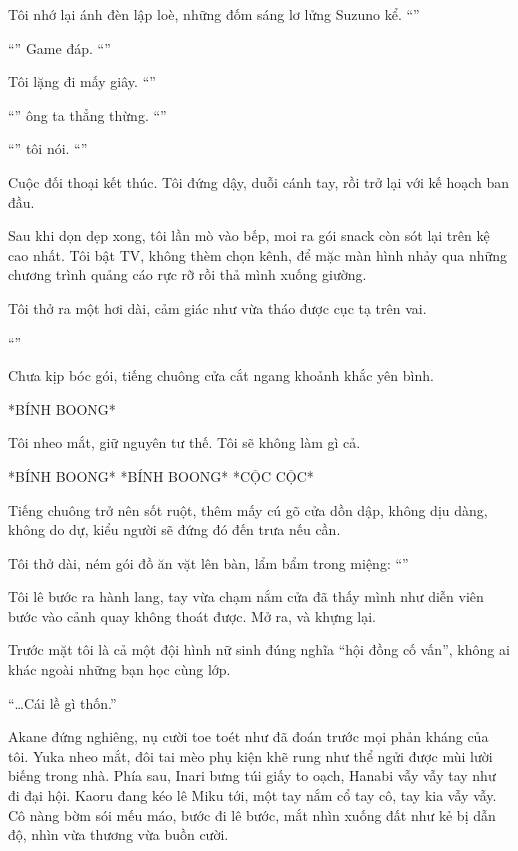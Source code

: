 \documentclass[../main.tex]{subfiles}
\begin{document}
Tôi nhớ lại ánh đèn lập loè, những đốm sáng lơ lửng Suzuno kể. ``''

``'' Game đáp. ``''

Tôi lặng đi mấy giây. ``''

``'' ông ta thẳng thừng. ``''

``'' tôi nói. ``''

Cuộc đối thoại kết thúc. Tôi đứng dậy, duỗi cánh tay, rồi trở lại với kế hoạch ban đầu.

Sau khi dọn dẹp xong, tôi lần mò vào bếp, moi ra gói snack còn sót lại trên kệ cao nhất. Tôi bật TV, không thèm chọn kênh, để mặc màn hình nhảy qua những chương trình quảng cáo rực rỡ rồi thả mình xuống giường.

Tôi thở ra một hơi dài, cảm giác như vừa tháo được cục tạ trên vai.

``''

Chưa kịp bóc gói, tiếng chuông cửa cắt ngang khoảnh khắc yên bình.

*BÍNH BOONG*

Tôi nheo mắt, giữ nguyên tư thế. Tôi sẽ không làm gì cả.

*BÍNH BOONG* *BÍNH BOONG* *CỘC CỘC*

Tiếng chuông trở nên sốt ruột, thêm mấy cú gõ cửa dồn dập, không dịu dàng, không do dự, kiểu người sẽ đứng đó đến trưa nếu cần.

Tôi thở dài, ném gói đồ ăn vặt lên bàn, lẩm bẩm trong miệng: ``''

Tôi lê bước ra hành lang, tay vừa chạm nắm cửa đã thấy mình như diễn viên bước vào cảnh quay không thoát được. Mở ra, và khựng lại.

Trước mặt tôi là cả một đội hình nữ sinh đúng nghĩa ``hội đồng cố vấn'', không ai khác ngoài những bạn học cùng lớp.

``\dots Cái lề gì thốn.''

Akane đứng nghiêng, nụ cười toe toét như đã đoán trước mọi phản kháng của tôi. Yuka nheo mắt, đôi tai mèo phụ kiện khẽ rung như thể ngửi được mùi lười biếng trong nhà. Phía sau, Inari bưng túi giấy to oạch, Hanabi vẫy vẫy tay như đi đại hội. Kaoru đang kéo lê Miku tới, một tay nắm cổ tay cô, tay kia vẫy vẫy. Cô nàng bờm sói mếu máo, bước đi lê bước, mắt nhìn xuống đất như kẻ bị dẫn độ, nhìn vừa thương vừa buồn cười.
\end{document}
